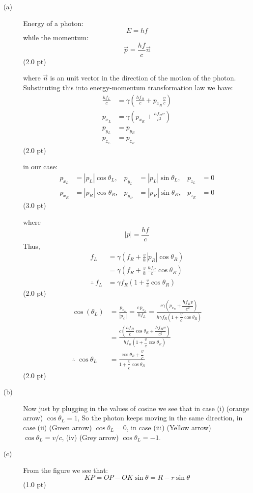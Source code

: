 \begin{description}
\item[(a)] Energy of a photon:
  \[ E = hf \]
  while the momentum:
  \[ \vec{p} = \frac{hf}{c}\vec{n} \]
  \hfill(2.0 pt)

  where $\vec{n}$ is an unit vector in the direction of the motion of the
  photon. Substituting this into energy-momentum transformation law we have:
  \begin{align*}
    \frac{hf_L}{c} &= \gamma\left(\frac{hf_R}{c} + p_{x_R}\frac{v}{c}\right)\\
    p_{x_L} &= \gamma\left(p_{x_R} + \frac{hf_R v}{c^2}\right)\\
    p_{y_L} &= p_{y_R}\\
    p_{z_L} &= p_{z_R}
  \end{align*}
  \hfill(2.0 pt)

  in our case:
  \begin{align*}
    p_{x_L} &= |p_L|\cos\theta_L, & p_{y_L} &= |p_L|\sin\theta_L,
      & p_{z_L} &= 0\\
    p_{x_R} &= |p_R|\cos\theta_R, & p_{y_R} &= |p_R|\sin\theta_R,
      & p_{z_R} &= 0
  \end{align*}
  \hfill(3.0 pt)

  where
  \[ |p| = \frac{hf}{c} \]
  Thus,
  \begin{align*}
    f_L &= \gamma\left(f_R + \frac{v}{h}|p_R|\cos\theta_R\right)\\
        &= \gamma\left(f_R + \frac{v}{h}\,\frac{hf_R}{c}\cos\theta_R\right)\\
    \therefore\ f_L &= \gamma f_R\left(1 + \frac{v}{c}\cos\theta_R\right)
  \end{align*}
  \hfill(2.0 pt)
  \begin{align*}
    \cos(\theta_L) &= \frac{p_{x_L}}{|p_L|} = \frac{c\,p_{x_L}}{hf_L}
      = \frac{c\gamma\left(p_{x_R} + \dfrac{hf_R v}{c^2}\right)}
             {h\gamma f_R\left(1 + \dfrac{v}{c}\cos\theta_R\right)}\\
    &= \frac{c\left(\dfrac{hf_R}{c}\cos\theta_R + \dfrac{hf_R v}{c^2}\right)}
            {hf_R\left(1 + \dfrac{v}{c}\cos\theta_R\right)}\\
    \therefore\ \cos\theta_L
      &= \frac{\cos\theta_R + \dfrac{v}{c}}
              {1 + \dfrac{v}{c}\cos\theta_R}
  \end{align*}
  \hfill(2.0 pt)
\item[(b)] Now just by plugging in the values of cosine we see that in case
  (i) (orange arrow) $\cos\theta_L = 1$, So the photon keeps moving in the
  same direction, in case (ii) (Green arrow) $\cos\theta_L = 0$, in case
  (iii) (Yellow arrow) $\cos\theta_L = v/c$, (iv) (Grey arrow)
  $\cos\theta_L = -1$.
\item[(c)] From the figure we see that:
  \[ KP = OP - OK\sin\theta = R - r\sin\theta \]
  \hfill(1.0 pt)


\end{description}
